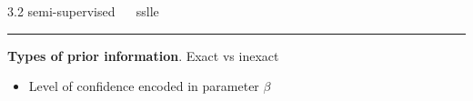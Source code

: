 \documentclass[11pt, compress, t, notes = noshow, xcolor = table, 
aspectratio = 1610]{beamer}
\newcommand{\highlight}[1]{\textcolor{highlightcol}{\textbf{#1}}}
\newcommand{\arritem}{\item[\highlight{$\rightarrow$}]}
\newcommand{\Y}{\mathcal{Y}}
\newcommand{\E}{\bm{E}}
\newcommand{\I}{\bm{I}}
\begin{document}

\LARGE
\begin{frame}{\textcolor{gray!90}{3.2 semi-supervised} ~~ sslle}
\normalsize
\vspace{-0.5cm}
\noindent \textcolor{gray!90}{\rule{\textwidth}{1pt}}
\smallskip

% 
% 

% 
% 
% 
% 
% 


\textbf{Types of prior information}. Exact vs inexact
\begin{itemize}
  \arritem Level of confidence encoded in parameter $\beta$
\end{itemize}


\end{frame}
\end{document}
